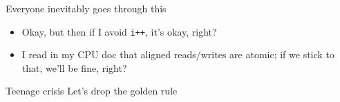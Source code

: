 \documentclass[xcolor={x11names,svgnames},x11names,svgnames]{beamer}
\begin{document}
\begin{frame}[label=guru_switch]
  \begin{exampleblock}{Everyone inevitably goes through this}
    \begin{itemize}
    \item Okay, but then if I avoid \texttt{i++}, it's okay, right?
    \item I read in my CPU doc that aligned reads/writes are atomic; if we stick to that, we'll be fine, right?
    \end{itemize}
  \end{exampleblock}

  \pause\bigskip
  \begin{alertblock}{Teenage crisis}
    Let's drop the golden rule
  \end{alertblock}

  \pause\bigskip
  
  
\end{frame}    

\end{document}
